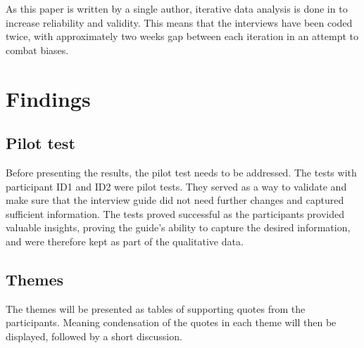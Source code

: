 As this paper is written by a single author, iterative data analysis is done in to increase reliability and validity. This means that the interviews have been coded twice, with approximately two weeks gap between each iteration in an attempt to combat biases.

\section{Findings}
\subsection{Pilot test}
Before presenting the results, the pilot test needs to be addressed. The tests with participant ID1 and ID2  were pilot tests. They served as a way to validate and make sure that the interview guide did not need further changes and captured sufficient information. The tests proved successful as the participants provided valuable insights, proving the guide's ability to capture the desired information, and were therefore kept as part of the qualitative data.

\subsection{Themes} \label{Themes}
The themes will be presented as tables of supporting quotes from the participants. Meaning condensation of the quotes in each theme will then be displayed, followed by a short discussion.


